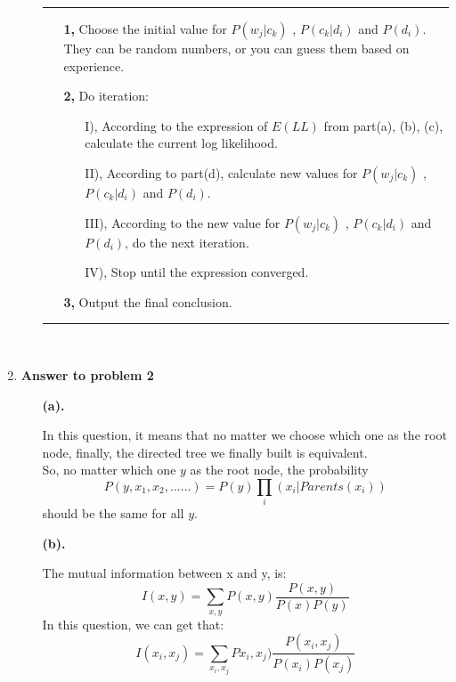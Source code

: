 \begin{enumerate}
\begin{enumerate}
\rule{15cm}{.1pt}
\begin{enumerate}
\item[\bf 1, ] Choose the initial value for $P(w_j|c_k)$ , $P(c_k|d_i)$ and 
$P(d_i)$. They can be random numbers, or you can guess them based on experience.\\

\item[\bf 2, ] Do iteration:
\begin{enumerate}
\item[I), ] According to the expression of $E(LL)$ from part(a), (b), (c), calculate the current log likelihood.
\item[II), ] According to part(d), calculate new values for $P(w_j|c_k)$ , $P(c_k|d_i)$ and $P(d_i)$.

\item[III), ] According to the new value for $P(w_j|c_k)$ , $P(c_k|d_i)$ and $P(d_i)$, do the next iteration.

\item[IV), ] Stop until the expression converged.\\
\end{enumerate}

\item[\bf 3, ] Output the final conclusion.

\end{enumerate}

\rule{15cm}{.1pt}\\
\end{enumerate}


\item {\bf Answer to problem 2}

\begin{enumerate}
\item[\bf (a). ]

In this question, it means that no matter we choose which one as the root node, finally, the directed tree we finally built is equivalent.\\

So, no matter which one $y$ as the root node, the probability 
$$P(y, x_1, x_2, ......) = P(y)\prod_i (x_i| Parents(x_i))$$
should be the same for all $y$.\\

\item[\bf (b). ]

The mutual information between x and y, is:
$$I(x, y) = \sum_{x, y} P(x, y)\frac{P(x, y)}{P(x)P(y)}$$
In this question, we can get that:
$$I(x_i, x_j) = \sum_{x_i, x_j} Px_i, x_j)\frac{P(x_i, x_j)}{P(x_i)P(x_j)}$$


\end{enumerate}
\end{enumerate}
